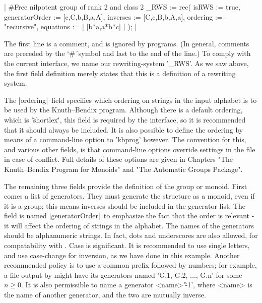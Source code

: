 |
#Free nilpotent group of rank 2 and class 2
_RWS := rec(
           isRWS := true,
  generatorOrder := [c,C,b,B,a,A],
        inverses := [C,c,B,b,A,a],
        ordering := "recursive",
       equations := [
         [b*a,a*b*c]
       ]
);
|

The first line is a comment, and is ignored by programs. (In general,
comments are preceded by the `\#\'\ symbol and last to the end of the line.)
To comply with the current {\GAP} interface, we name our rewriting-system
'\_RWS'.
As we saw above, the first field definition merely states that this is a
definition of a rewriting system.

The |ordering|\ field specifies which
ordering on strings in the input alphabet is to be used by the Knuth--Bendix
program. Although there is a default ordering, which is '\"shortlex\"',
this field is required by the {\GAP} interface, so it is recommended that
it should always be included.
It is also possible
to define the ordering by means of a command-line option to 'kbprog'
however. The convention for this, and various other fields, is that
command-line options override settings in the file in case of conflict.
Full details of these options are given in Chapters
"The Knuth--Bendix Program for Monoids" and "The Automatic Groups Package".

The remaining three fields provide the definition of the group or monoid.
First comes a list of generators. They must generate the structure as a monoid,
even if it is a group; this means inverses should be included in the generator
list. The field is named |generatorOrder|\ to emphasize the fact that the
order is relevant - it will affect the ordering of strings in the alphabet.
The names of the generators should be alphanumeric strings. In fact,
dots and underscores are also allowed, for compatability with {\GAP}.
Case is significant. It is recommended to use single letters, and use
case-change for inversion, as we have done in this example. Another
recommended policy is to use a common prefix followed by numbers; for
example, a file output by {\GAP} might have its generators named
'G.1, G.2, ..., G.n' for some $n \ge 0$. It is also permissible to name a
generator <name>'\^-1', where <name> is the name of another generator, and
the two are mutually inverse.


